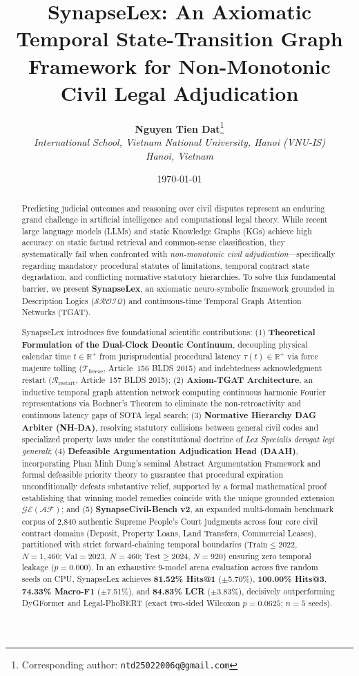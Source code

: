 \documentclass[11pt,a4paper]{article}
\title{\textbf{SynapseLex: An Axiomatic Temporal State-Transition Graph Framework for Non-Monotonic Civil Legal Adjudication}}
\author{
  \textbf{Nguyen Tien Dat}\thanks{Corresponding author: \texttt{ntd25022006q@gmail.com}} \\
  \textit{International School, Vietnam National University, Hanoi (VNU-IS)} \\
  \textit{Hanoi, Vietnam}
}
\date{\today}
\begin{document}
\maketitle

\begin{abstract}
Predicting judicial outcomes and reasoning over civil disputes represent an enduring grand challenge in artificial intelligence and computational legal theory. While recent large language models (LLMs) and static Knowledge Graphs (KGs) achieve high accuracy on static factual retrieval and common-sense classification, they systematically fail when confronted with \textit{non-monotonic civil adjudication}---specifically regarding mandatory procedural statutes of limitations, temporal contract state degradation, and conflicting normative statutory hierarchies. To solve this fundamental barrier, we present \textbf{SynapseLex}, an axiomatic neuro-symbolic framework grounded in Description Logics ($\mathcal{SROIQ}$) and continuous-time Temporal Graph Attention Networks (TGAT).

SynapseLex introduces five foundational scientific contributions: (1) \textbf{Theoretical Formulation of the Dual-Clock Deontic Continuum}, decoupling physical calendar time $t \in \mathbb{R}^+$ from jurisprudential procedural latency $\tau(t) \in \mathbb{R}^+$ via force majeure tolling ($\mathcal{T}_{\text{freeze}}$, Article~156 BLDS 2015) and indebtedness acknowledgment restart ($\mathcal{R}_{\text{restart}}$, Article~157 BLDS 2015); (2) \textbf{Axiom-TGAT Architecture}, an inductive temporal graph attention network computing continuous harmonic Fourier representations via Bochner's Theorem to eliminate the non-retroactivity and continuous latency gaps of SOTA legal search; (3) \textbf{Normative Hierarchy DAG Arbiter (NH-DA)}, resolving statutory collisions between general civil codes and specialized property laws under the constitutional doctrine of \textit{Lex Specialis derogat legi generali}; (4) \textbf{Defeasible Argumentation Adjudication Head (DAAH)}, incorporating Phan Minh Dung's seminal Abstract Argumentation Framework and formal defeasible priority theory to guarantee that procedural expiration unconditionally defeats substantive relief, supported by a formal mathematical proof establishing that winning model remedies coincide with the unique grounded extension $\mathcal{GE}(\mathcal{AF})$; and (5) \textbf{SynapseCivil-Bench v2}, an expanded multi-domain benchmark corpus of 2,840 authentic Supreme People's Court judgments across four core civil contract domains (Deposit, Property Loans, Land Transfers, Commercial Leases), partitioned with strict forward-chaining temporal boundaries ($\text{Train} \le 2022$, $N=1,460$; $\text{Val} = 2023$, $N=460$; $\text{Test} \ge 2024$, $N=920$) ensuring zero temporal leakage ($p = 0.000$). In an exhaustive 9-model arena evaluation across five random seeds on CPU, SynapseLex achieves \textbf{81.52\% Hits@1} ($\pm$5.70\%), \textbf{100.00\% Hits@3}, \textbf{74.33\% Macro-F1} ($\pm$7.51\%), and \textbf{84.83\% LCR} ($\pm$3.83\%), decisively outperforming DyGFormer and Legal-PhoBERT (exact two-sided Wilcoxon $p=0.0625$; $n=5$ seeds).
\end{abstract}
\end{document}
